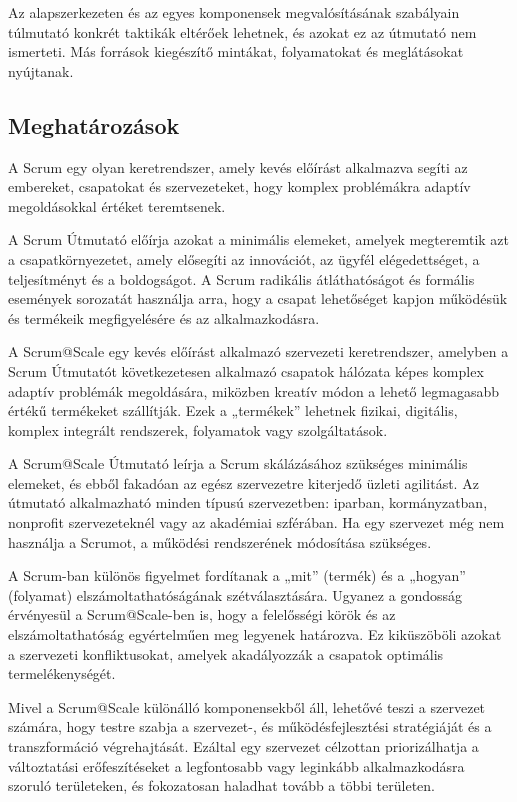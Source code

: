 \documentclass[12pt,a4paper,parskip=full]{scrartcl}
\begin{document}
Az alapszerkezeten és az egyes komponensek megvalósításának szabályain túlmutató konkrét taktikák eltérőek lehetnek, és azokat ez az útmutató nem ismerteti. Más források kiegészítő mintákat, folyamatokat és meglátásokat nyújtanak.

\subsection{Meghatározások}\label{definitions}

A Scrum egy olyan keretrendszer, amely kevés előírást alkalmazva segíti az embereket, csapatokat és szervezeteket, hogy komplex problémákra adaptív megoldásokkal értéket teremtsenek.

A Scrum Útmutató előírja azokat a minimális elemeket, amelyek megteremtik azt a csapatkörnyezetet, amely elősegíti az innovációt, az ügyfél elégedettséget, a teljesítményt és a boldogságot. A Scrum radikális átláthatóságot és formális események sorozatát használja arra, hogy a csapat lehetőséget kapjon működésük és termékeik megfigyelésére és az alkalmazkodásra.

A Scrum@Scale egy kevés előírást alkalmazó szervezeti keretrendszer, amelyben a Scrum Útmutatót következetesen alkalmazó csapatok hálózata képes komplex adaptív problémák megoldására, miközben kreatív módon a lehető legmagasabb értékű termékeket szállítják. Ezek a „termékek” lehetnek fizikai, digitális, komplex integrált rendszerek, folyamatok vagy szolgáltatások.

A Scrum@Scale Útmutató leírja a Scrum skálázásához szükséges minimális elemeket, és ebből fakadóan az egész szervezetre kiterjedő üzleti agilitást. Az útmutató alkalmazható minden típusú szervezetben: iparban, kormányzatban, nonprofit szervezeteknél vagy az akadémiai szférában. Ha egy szervezet még nem használja a Scrumot, a működési rendszerének módosítása szükséges.

A Scrum-ban különös figyelmet fordítanak a „mit” (termék) és a „hogyan” (folyamat) elszámoltathatóságának szétválasztására. Ugyanez a gondosság érvényesül a Scrum@Scale-ben is, hogy a felelősségi körök és az elszámoltathatóság egyértelműen meg legyenek határozva. Ez kiküszöböli azokat a szervezeti konfliktusokat, amelyek akadályozzák a csapatok optimális termelékenységét. 

Mivel a Scrum@Scale különálló komponensekből áll, lehetővé teszi a szervezet számára, hogy testre szabja a szervezet-, és működésfejlesztési stratégiáját és a transzformáció végrehajtását. Ezáltal egy szervezet célzottan priorizálhatja a változtatási erőfeszítéseket a legfontosabb vagy leginkább alkalmazkodásra szoruló területeken, és fokozatosan haladhat tovább a többi területen.
\end{document}
